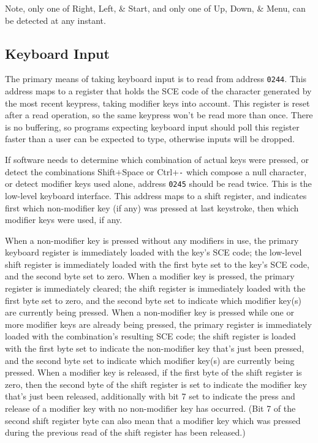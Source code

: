 \documentclass[12pt]{{memoir}}
\begin{document}
Note, only one of \textsf{Right}, \textsf{Left}, \& \textsf{Start}, and only one of \textsf{Up}, \textsf{Down}, \& \textsf{Menu}, can be detected at any instant.

\subsection{Keyboard Input}
\label{ss:keyboard}

The primary means of taking keyboard input is to read from address \texttt{0244}. This address maps to a register that holds the SCE code of the character generated by the most recent keypress, taking modifier keys into account. This register is reset after a read operation, so the same keypress won't be read more than once. There is no buffering, so programs expecting keyboard input should poll this register faster than a user can be expected to type, otherwise inputs will be dropped.

If software needs to determine which combination of actual keys were pressed, or detect the combinations \textsf{Shift+Space} or \textsf{Ctrl+}\texttt{-} which compose a null character, or detect modifier keys used alone, address \texttt{0245} should be read twice. This is the low-level keyboard interface. This address maps to a shift register, and indicates first which non-modifier key (if any) was pressed at last keystroke, then which modifier keys were used, if any.

When a non-modifier key is pressed without any modifiers in use, the primary keyboard register is immediately loaded with the key's SCE code; the low-level shift register is immediately loaded with the first byte set to the key's SCE code, and the second byte set to zero. When a modifier key is pressed, the primary register is immediately cleared; the shift register is immediately loaded with the first byte set to zero, and the second byte set to indicate which modifier key(s) are currently being pressed. When a non-modifier key is pressed while one or more modifier keys are already being pressed, the primary register is immediately loaded with the combination's resulting SCE code; the shift register is loaded with the first byte set to indicate the non-modifier key that's just been pressed, and the second byte set to indicate which modifier key(s) are currently being pressed. When a modifier key is released, if the first byte of the shift register is zero, then the second byte of the shift register is set to indicate the modifier key that's just been released, additionally with bit 7 set to indicate the press and release of a modifier key with no non-modifier key has occurred. (Bit 7 of the second shift register byte can also mean that a modifier key which was pressed during the previous read of the shift register has been released.)
\end{document}
